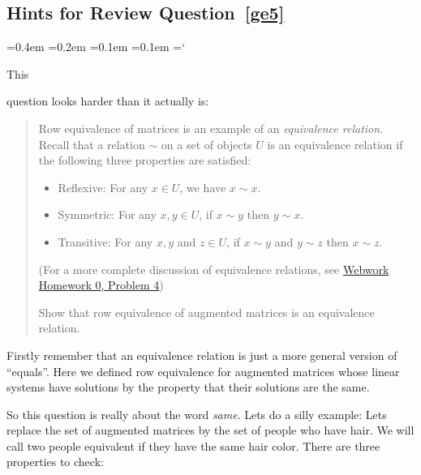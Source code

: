 
\subsection*{Hints for Review Question~\ref{ge5}}

{\ttfamily
{}\font=0.4em
\font=0.2em
\font=0.1em
\font=0.1em
\hyphenchar\font=`\-



\hypertarget{script_gaussian_elimination_hints}{This} question looks harder than it actually is:

\begin{quote}{\small
Row equivalence of matrices is an example of an \emph{equivalence relation}.  Recall that a relation $\sim$ on a set of objects $U$ is an equivalence relation if the following three properties are satisfied:
\begin{itemize}
\item Reflexive:  For any $x\in U$, we have $x\sim x$.
\item Symmetric:  For any $x,y \in U$, if $x\sim y$ then $y\sim x$.
\item Transitive: For any $x,y$ and $z \in U$, if $x\sim y$ and $y\sim z$ then $x\sim z$.
\end{itemize}

(For a more complete discussion of equivalence relations, see \href{\webworkurl Homework0-Background/4/}{Webwork Homework 0, Problem 4})

Show that row equivalence of augmented matrices is an equivalence relation.
}
\end{quote}

Firstly remember that an equivalence relation is just a more general version of ``equals''.
Here we defined row equivalence  for augmented matrices whose linear systems have
solutions by the property that their solutions are the same.

So this question is really about the word {\itshape same}. Lets do a silly example:
Lets replace the set of augmented matrices by the set of people who have hair.
We will call two people equivalent if they have the same hair color. There are three properties
to check:

}
